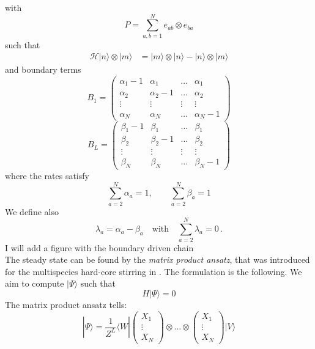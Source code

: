 \documentclass[11pt]{article}
\numberwithin{equation}{section}
\numberwithin{equation}{subsection}
\begin{document}
with 
\begin{equation}
	P=\sum_{a,b=1}^Ne_{ab}\otimes e_{ba}
\end{equation} 
such that
\begin{equation}
	\begin{split}
		\mathcal{H}|n\rangle\otimes   |m\rangle&=|m\rangle \otimes |n\rangle-|n\rangle \otimes|m\rangle
	\end{split}
\end{equation}
and boundary terms 
\begin{equation}
	B_{1}=\begin{pmatrix}
		\alpha_{1}-1&\alpha_{1}&\ldots&\alpha_{1}\\
		\alpha_{2}&\alpha_{2}-1&\ldots&\alpha_{2}\\
		\vdots&\vdots&\vdots&\vdots\\
		\alpha_{N}&\alpha_{N}&\ldots&\alpha_{N}-1
	\end{pmatrix}
\end{equation}
\begin{equation}
	B_{L}=\begin{pmatrix}
		\beta_{1}-1&\beta_{1}&\ldots&\beta_{1}\\
		\beta_{2}&\beta_{2}-1&\ldots&\beta_{2}\\
		\vdots&\vdots&\vdots&\vdots\\
		\beta_{N}&\beta_{N}&\ldots&\beta_{N}-1
	\end{pmatrix}
\end{equation}
where the rates satisfy
\begin{equation}\label{ratesConditions}
	\sum_{a=2}^{N}\alpha_{a}=1,\qquad\sum_{a=2}^{N}\beta_{a}=1
\end{equation} 
We define also 
\begin{equation}\label{lambdaConditions}
	\lambda_{a}=\alpha_{a}-\beta_{a}\quad\text{with}\quad \sum_{a=2}^{N}\lambda_{a}=0\,.
\end{equation}
{\color{red} I will add a figure with the boundary driven chain}\\
The steady state can be found by the \textit{matrix product ansatz}, that was introduced for the multispecies hard-core stirring in \cite{vanicat2017exact}. The formulation is the following. We aim to compute $|\Psi\rangle$ such that 
\begin{equation}
	H|\Psi\rangle =0
\end{equation}
The matrix product ansatz tells:
\begin{equation}
	|\Psi\rangle=\frac{1}{Z^{L}}\langle W|\begin{pmatrix}
		X_{1}\\
		\vdots\\
		X_{N}
	\end{pmatrix}\otimes \ldots\otimes \begin{pmatrix}
		X_{1}\\
		\vdots\\
		X_{N}
	\end{pmatrix}|V\rangle
\end{equation}
\end{document}
